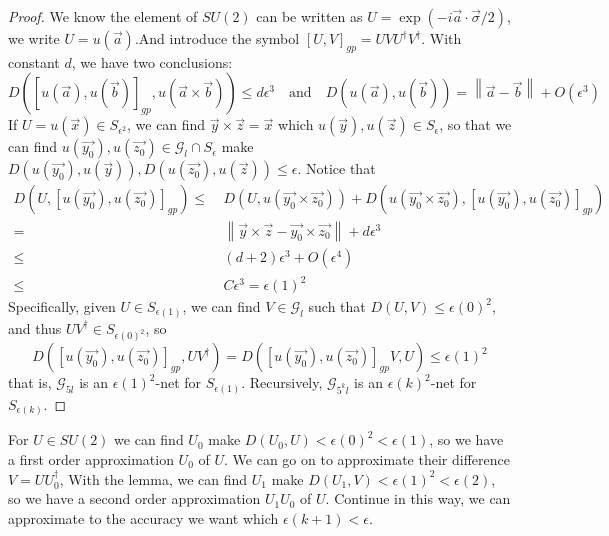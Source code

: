 \documentclass[a4paper,10pt]{article}
\numberwithin{equation}{subsection}
\begin{document}
\begin{proof}
    We know the element of $SU(2)$ can be written as $U=\exp(-i\vec{a}\cdot\vec{\sigma}/2)$, we write $U=u(\vec{a})$.And introduce the symbol $[U,V]_{gp}=UVU^{\dagger}V^{\dagger}$. With constant $d$, we have two conclusions:
    \begin{equation}
        D([u(\vec{a}),u(\vec{b})]_{gp},u(\vec{a}\times\vec{b}))\leq d\epsilon^{3}\quad\text{and}\quad D(u(\vec{a}),u(\vec{b}))=\left\| \vec{a}-\vec{b} \right\| + O(\epsilon^{3})
    \end{equation}
    If $U=u(\vec{x})\in S_{\epsilon^{2}}$, we can find $\vec{y}\times \vec{z}=\vec{x}$ which $u(\vec{y}),u(\vec{z})\in S_{\epsilon}$, so that we can find $u(\vec{y_{0}}),u(\vec{z_{0}})\in \mathcal{G}_{l}\cap S_{\epsilon}$ make $D(u(\vec{y_{0}}),u(\vec{y})),D(u(\vec{z_{0}}),u(\vec{z}))\leq \epsilon$. Notice that
    \begin{equation}
        \begin{split}
            D(U,[u(\vec{y_{0}}),u(\vec{z_{0}})]_{gp})\leq & \ D(U,u(\vec{y_{0}}\times\vec{z_{0}}))+D(u(\vec{y_{0}}\times\vec{z_{0}}),[u(\vec{y_{0}}),u(\vec{z_{0}})]_{gp}) \\
            =                                             & \  \left\| \vec{y}\times\vec{z}-\vec{y_{0}}\times\vec{z_{0}} \right\|+d\epsilon^{3}                            \\
            \leq                                          & \ (d+2)\epsilon^{3}+O(\epsilon^{4})                                                                            \\
            \leq                                          & \ C\epsilon^{3} = \epsilon(1)^{2}
        \end{split}
    \end{equation}
    Specifically, given $U\in S_{\epsilon(1)}$, we can find $V\in\mathcal{G}_{l}$ such that $D(U,V)\leq \epsilon(0)^{2}$, and thus $UV^{\dagger}\in S_{\epsilon(0)^{2}}$, so
    \begin{equation}
        D([u(\vec{y_{0}}),u(\vec{z_{0}})]_{gp},UV^{\dagger})=D([u(\vec{y_{0}}),u(\vec{z_{0}})]_{gp}V,U)\leq\epsilon(1)^{2}
    \end{equation}
    that is, $\mathcal{G}_{5l}$ is an $\epsilon(1)^{2}$-net for $S_{\epsilon(1)}$. Recursively, $\mathcal{G}_{5^{k}l}$ is an $\epsilon(k)^{2}$-net for $S_{\epsilon(k)}$.
\end{proof}
For $U\in SU(2)$ we can find $U_{0}$ make $D(U_{0},U)<\epsilon(0)^{2}<\epsilon(1)$, so we have a first order approximation $U_{0}$ of $U$.  We can go on to approximate their difference $V=UU_{0}^{\dagger}$, With the lemma, we can find $U_{1}$ make $D(U_{1},V)<\epsilon(1)^{2}<\epsilon(2)$, so we have a second order approximation $U_{1}U_{0}$ of $U$. Continue in this way, we can approximate to the accuracy we want which $\epsilon(k+1)<\epsilon$.
\end{document}
